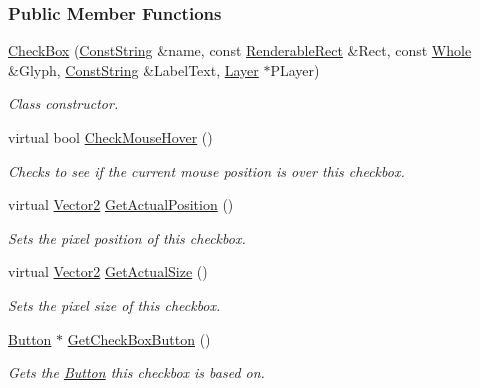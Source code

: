 \subsubsection*{Public Member Functions}
\begin{DoxyCompactItemize}
\item 
\hyperlink{classphys_1_1UI_1_1CheckBox_abeaca46fbfa961670c20ad949627d0fa}{CheckBox} (\hyperlink{namespacephys_a5ce5049f8b4bf88d6413c47b504ebb31}{ConstString} \&name, const \hyperlink{structphys_1_1UI_1_1RenderableRect}{RenderableRect} \&Rect, const \hyperlink{namespacephys_a460f6bc24c8dd347b05e0366ae34f34a}{Whole} \&Glyph, \hyperlink{namespacephys_a5ce5049f8b4bf88d6413c47b504ebb31}{ConstString} \&LabelText, \hyperlink{classphys_1_1UI_1_1Layer}{Layer} $\ast$PLayer)
\begin{DoxyCompactList}\small\item\em Class constructor. \item\end{DoxyCompactList}\item 
virtual bool \hyperlink{classphys_1_1UI_1_1CheckBox_a3c9b10c692dfb62dedbd091dac12c115}{CheckMouseHover} ()
\begin{DoxyCompactList}\small\item\em Checks to see if the current mouse position is over this checkbox. \item\end{DoxyCompactList}\item 
virtual \hyperlink{classphys_1_1Vector2}{Vector2} \hyperlink{classphys_1_1UI_1_1CheckBox_a33bedaa00456be8ca0e9b2eafcd5b21a}{GetActualPosition} ()
\begin{DoxyCompactList}\small\item\em Sets the pixel position of this checkbox. \item\end{DoxyCompactList}\item 
virtual \hyperlink{classphys_1_1Vector2}{Vector2} \hyperlink{classphys_1_1UI_1_1CheckBox_aa13946ced3947a13f8f30dd97ffba245}{GetActualSize} ()
\begin{DoxyCompactList}\small\item\em Sets the pixel size of this checkbox. \item\end{DoxyCompactList}\item 
\hyperlink{classphys_1_1UI_1_1Button}{Button} $\ast$ \hyperlink{classphys_1_1UI_1_1CheckBox_a728de15a5c8e512fd3fbb2b8a3f808ee}{GetCheckBoxButton} ()
\begin{DoxyCompactList}\small\item\em Gets the \hyperlink{classphys_1_1UI_1_1Button}{Button} this checkbox is based on. \item\end{DoxyCompactList}\item 

\end{DoxyCompactItemize}
